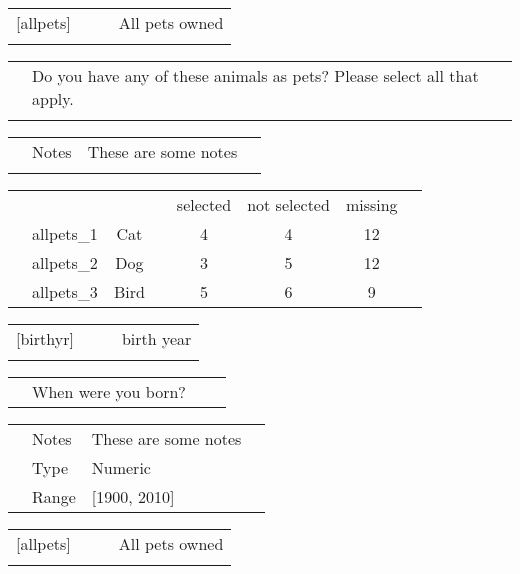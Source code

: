 \documentclass{article}
\begin{document}
{\begin{table}
\begin{tabularx}{\textwidth}{lXXr}
 [allpets] &  &  & All pets owned \\
 & & & \\
\end{tabularx}

\begin{tabularx}{\textwidth}{lX}
  & Do you have any of these animals as pets? Please select all that apply. \\
  \\
\end{tabularx}

\begin{tabularx}{\textwidth}{lllr}
 & Notes &  These are some notes &  \\
 & & & &
\end{tabularx}

\begin{tabularx}{\textwidth}{llcXcccr}
 &            &      &         & selected & not selected  & missing \\
 & allpets\_1 & Cat  & \dotfill & 4 & 4 & 12 & \\
 & allpets\_2 & Dog  & \dotfill & 3 & 5 & 12 & \\
 & allpets\_3 & Bird & \dotfill & 5 & 6 & 9 & \\
\end{tabularx}
\end{table}


\begin{table}
\begin{tabularx}{\textwidth}{lXXr}
 [birthyr] &  &  & birth year \\
 & & & \\
\end{tabularx}

\begin{tabularx}{\textwidth}{lXXr}
  & When were you born? & & & \\
\end{tabularx}

\begin{tabularx}{\textwidth}{lllr}
 & Notes &  These are some notes &  \\
 & Type & Numeric & \\
 & Range & [1900, 2010] & \\
\end{tabularx}
\end{table}

\begin{table}
\begin{tabularx}{\textwidth}{lXXr}
 [allpets] &  &  & All pets owned \\
 & & & \\
\end{tabularx}


\end{table}}
\end{document}
